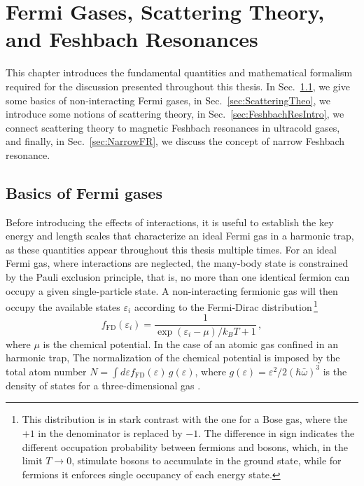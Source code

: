 \chapter{Fermi Gases, Scattering Theory, and Feshbach Resonances}
\label{Chpt:Feshbach} %

This chapter introduces the fundamental quantities and mathematical formalism required for the discussion presented throughout this thesis. In Sec.~\ref{sec:FermiGases}, we give some basics of non-interacting Fermi gases, in Sec.~\ref{sec:ScatteringTheo}, we introduce some notions of scattering theory, in Sec.~\ref{sec:FeshbachResIntro}, we connect scattering theory to magnetic Feshbach resonances in ultracold gases, and finally, in Sec.~\ref{sec:NarrowFR}, we discuss the concept of {narrow} Feshbach resonance.


\section{Basics of Fermi gases}
\label{sec:FermiGases}

Before introducing the effects of interactions, it is useful to establish the key energy and length scales that characterize an ideal Fermi gas in a harmonic trap, as these quantities appear throughout this thesis multiple times. For an ideal Fermi gas, where interactions are neglected, the many-body state is constrained by the Pauli exclusion principle, that is,  no more than one identical fermion can occupy a given single-particle state. A non-interacting fermionic gas will then occupy the available states $\varepsilon_i$ according to the Fermi-Dirac distribution\,\footnote{This distribution is in stark contrast with the one for a Bose gas, where the $+1$ in the denominator is replaced by $-1$. The difference in sign indicates the different occupation probability between fermions and bosons, which, in the limit $T\to0$, stimulate bosons to accumulate in the ground state, while for fermions it enforces single occupancy of each energy state.}
\begin{equation}\label{eq:FDdistro}	
	f_{\mathrm{FD}}(\varepsilon_i)=\frac{1}{\exp{(\varepsilon_i-\mu)/k_BT}+1}\,,
\end{equation}
where $\mu$ is the chemical potential. In the case of an atomic gas confined in an harmonic trap, The normalization of the chemical potential is imposed by the total atom number $N=\int d\varepsilon f_{\mathrm{FD}}(\varepsilon)\,g(\varepsilon)$, where  $g(\varepsilon)=\varepsilon^2/2(\hbar\bar{\omega})^3$ is the density of states for a three-dimensional gas \cite{Pethick2002book, Pitaevskii2016book}.


